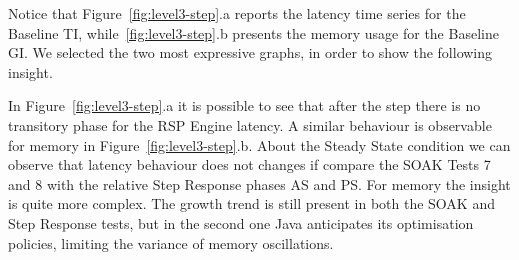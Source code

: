 Notice that Figure~\ref{fig:level3-step}.a reports the latency time series for the Baseline TI, while~\ref{fig:level3-step}.b presents the memory usage for the Baseline GI. We selected the two most expressive graphs, in order to show the following insight.

%
%

In Figure~\ref{fig:level3-step}.a  it is possible to see that after the step there is no transitory phase for the RSP Engine latency. A similar behaviour is observable for memory in Figure~\ref{fig:level3-step}.b. About the Steady State condition we can observe that latency behaviour does not changes if compare the SOAK Tests 7 and 8 with the relative  Step Response phases AS and PS. For memory the insight is quite more complex. The growth trend is still present in both the SOAK and Step Response tests, but in the second one Java anticipates its optimisation policies, limiting the variance of memory oscillations. 



